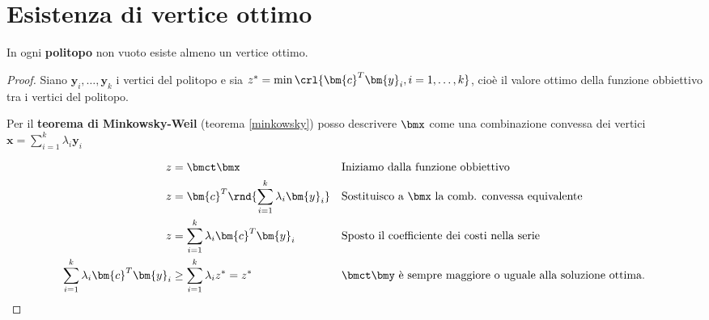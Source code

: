 \documentclass[\main/main.tex]{subfiles}
\begin{document}
\section{Esistenza di vertice ottimo}

\begin{theorem}
  In ogni \textbf{politopo} non vuoto esiste almeno un vertice ottimo.
\end{theorem}

\begin{proof}
  Siano $\bm{y}_i, \ldots, \bm{y}_k$ i vertici del politopo e sia $z^* = \min \crl{\bm{c}^T\bm{y}_i, i=1,\ldots,k}$, cioè il valore ottimo della funzione obbiettivo tra i vertici del politopo.

  Per il \textbf{teorema di Minkowsky-Weil} (teorema \ref{minkowsky}) posso descrivere $\bmx$ come una combinazione convessa dei vertici $\bm{x} = \sum_{i=1}^k \lambda_i \bm{y}_i$

  \begin{align*}
    z                                       & = \bmct \bmx                                    &  & \text{Iniziamo dalla funzione obbiettivo}                             \\
    z                                       & = \bm{c}^T\rnd{\sum_{i=1}^k \lambda_i \bm{y}_i} &  & \text{Sostituisco a $\bmx$ la comb. convessa equivalente}             \\
    z                                       & = \sum_{i=1}^k \lambda_i \bm{c}^T\bm{y}_i       &  & \text{Sposto il coefficiente dei costi nella serie}                   \\
    \sum_{i=1}^k \lambda_i \bm{c}^T\bm{y}_i & \geq \sum_{i=1}^k  \lambda_i z^* = z^*          &  & \text{$\bmct \bmy$ è sempre maggiore o uguale alla soluzione ottima.} \\
  \end{align*}
\end{proof}
\end{document}
